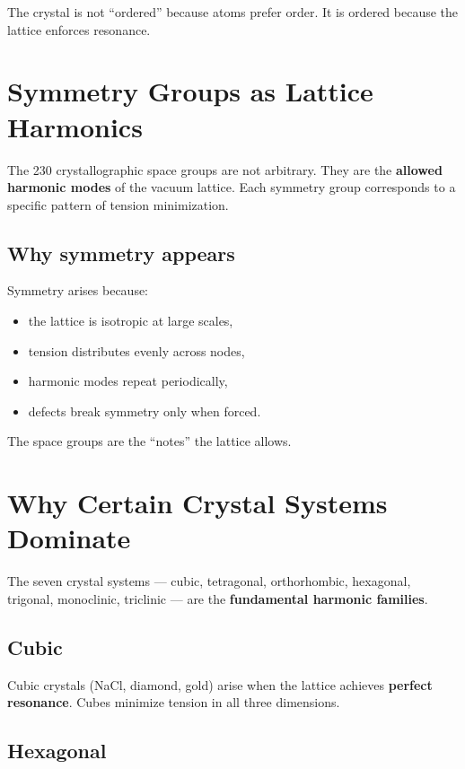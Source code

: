\documentclass[11pt, letterpaper, openany]{book}
\begin{document}
The crystal is not “ordered” because atoms prefer order.  
It is ordered because the lattice enforces resonance.

\section{Symmetry Groups as Lattice Harmonics}

The 230 crystallographic space groups are not arbitrary. They are the \textbf{allowed
harmonic modes} of the vacuum lattice. Each symmetry group corresponds to a specific
pattern of tension minimization.

\subsection*{Why symmetry appears}

Symmetry arises because:

\begin{itemize}
    \item the lattice is isotropic at large scales,
    \item tension distributes evenly across nodes,
    \item harmonic modes repeat periodically,
    \item defects break symmetry only when forced.
\end{itemize}

The space groups are the “notes” the lattice allows.

\section{Why Certain Crystal Systems Dominate}

The seven crystal systems — cubic, tetragonal, orthorhombic, hexagonal, trigonal,
monoclinic, triclinic — are the \textbf{fundamental harmonic families}.

\subsection*{Cubic}

Cubic crystals (NaCl, diamond, gold) arise when the lattice achieves \textbf{perfect
resonance}. Cubes minimize tension in all three dimensions.

\subsection*{Hexagonal}
\end{document}
